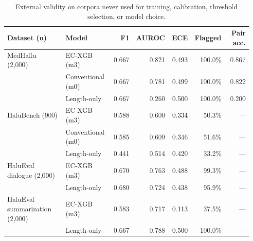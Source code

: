 \documentclass[a4paper,fleqn]{cas-sc}
\begin{document}
\begin{table}[pos=htbp]
  \centering
  \caption{External validity on corpora never used for training, calibration, threshold selection, or model choice.}
  \label{tab:external}
  \begin{tabular}{llrrrrr}
    \toprule
    \textbf{Dataset (n)}             & \textbf{Model}    & \textbf{F1} & \textbf{AUROC} & \textbf{ECE} & \textbf{Flagged} & \textbf{Pair acc.} \\
    \midrule
    MedHallu (2{,}000)               & EC-XGB (m3)       & 0.667       & 0.821          & 0.493        & 100.0\%          & 0.867              \\
                                     & Conventional (m0) & 0.667       & 0.781          & 0.499        & 100.0\%          & 0.822              \\
                                     & Length-only       & 0.667       & 0.260          & 0.500        & 100.0\%          & 0.200              \\
    \addlinespace
    HaluBench (900)                  & EC-XGB (m3)       & 0.588       & 0.600          & 0.334        & 50.3\%           & ---                \\
                                     & Conventional (m0) & 0.585       & 0.609          & 0.346        & 51.6\%           & ---                \\
                                     & Length-only       & 0.441       & 0.514          & 0.420        & 33.2\%           & ---                \\
    \addlinespace
    HaluEval dialogue (2{,}000)      & EC-XGB (m3)       & 0.670       & 0.763          & 0.488        & 99.3\%           & ---                \\
                                     & Length-only       & 0.680       & 0.724          & 0.438        & 95.9\%           & ---                \\
    \addlinespace
    HaluEval summarization (2{,}000) & EC-XGB (m3)       & 0.583       & 0.717          & 0.113        & 37.5\%           & ---                \\
                                     & Length-only       & 0.667       & 0.788          & 0.500        & 100.0\%          & ---                \\
    \bottomrule
  \end{tabular}
\end{table}
\end{document}
